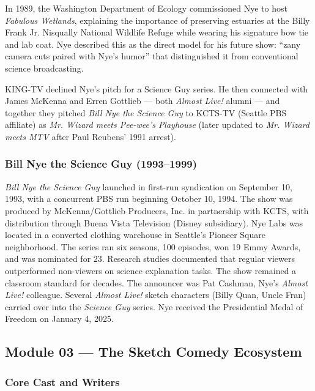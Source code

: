 \documentclass[11pt,letterpaper]{article}
\begin{document}
In 1989, the Washington Department of Ecology commissioned Nye to host \textit{Fabulous Wetlands}, explaining the importance of preserving estuaries at the Billy Frank Jr. Nisqually National Wildlife Refuge while wearing his signature bow tie and lab coat. Nye described this as the direct model for his future show: ``zany camera cuts paired with Nye's humor'' that distinguished it from conventional science broadcasting.

KING-TV declined Nye's pitch for a Science Guy series. He then connected with James McKenna and Erren Gottlieb --- both \textit{Almost Live!} alumni --- and together they pitched \textit{Bill Nye the Science Guy} to KCTS-TV (Seattle PBS affiliate) as \textit{Mr. Wizard meets Pee-wee's Playhouse} (later updated to \textit{Mr. Wizard meets MTV} after Paul Reubens' 1991 arrest).

\subsubsection{Bill Nye the Science Guy (1993--1999)}

\textit{Bill Nye the Science Guy} launched in first-run syndication on September 10, 1993, with a concurrent PBS run beginning October 10, 1994. The show was produced by McKenna/Gottlieb Producers, Inc. in partnership with KCTS, with distribution through Buena Vista Television (Disney subsidiary). Nye Labs was located in a converted clothing warehouse in Seattle's Pioneer Square neighborhood. The series ran six seasons, 100 episodes, won 19 Emmy Awards, and was nominated for 23. Research studies documented that regular viewers outperformed non-viewers on science explanation tasks. The show remained a classroom standard for decades. The announcer was Pat Cashman, Nye's \textit{Almost Live!} colleague. Several \textit{Almost Live!} sketch characters (Billy Quan, Uncle Fran) carried over into the \textit{Science Guy} series. Nye received the Presidential Medal of Freedom on January 4, 2025.

\subsection{Module 03 --- The Sketch Comedy Ecosystem}

\subsubsection{Core Cast and Writers}
\end{document}
